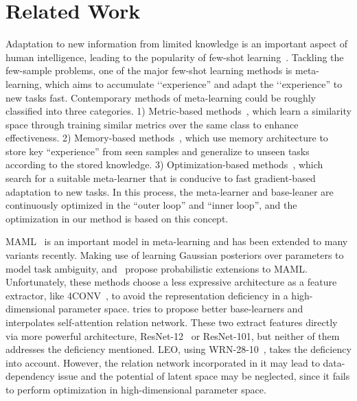 \documentclass[10pt,conference,a4paper]{IEEEtran}
\begin{document}
\section{Related Work}
Adaptation to new information from limited knowledge is an important aspect of human intelligence, leading to the popularity of few-shot learning~\cite{finn2017model, vinyals2016matching, snell2017prototypical, sung2018learning, DBLP:journals/corr/abs-1904-06317}. Tackling the few-sample problems, one of the major few-shot learning methods is meta-learning, which aims to accumulate ‘‘experience'' and adapt the ‘‘experience'' to new tasks fast. Contemporary methods of meta-learning could be roughly classified into three categories. 1) Metric-based methods~\cite{snell2017prototypical, vinyals2016matching, sung2018learning}, which learn a similarity space through training similar metrics over the same class to enhance effectiveness. 2) Memory-based methods~\cite{oreshkin2018tadam, mishra2018a}, which use memory architecture to store key “experience” from seen samples and generalize to unseen tasks according to the stored knowledge. 3) Optimization-based methods~\cite{finn2017model, lee2018gradient, grant2018recasting}, which search for a suitable meta-learner that is conducive to fast gradient-based adaptation to new tasks. In this process, the meta-learner and base-leaner are continuously optimized in the “outer loop” and “inner loop”, and the optimization in our method is based on this concept.

MAML~\cite{finn2017model} is an important model in meta-learning and has been extended to many variants recently. Making use of learning Gaussian posteriors over parameters to model task ambiguity, \cite{PLATIPUS2018} and~\cite{bayesianMAML2018} propose probabilistic extensions to MAML. Unfortunately, these methods choose a less expressive architecture as a feature extractor, like 4CONV~\cite{finn2017model}, to avoid the representation deficiency in a high-dimensional parameter space. \cite{lee2019meta} tries to propose better base-learners and~\cite{hui2019self} interpolates self-attention relation network. These two extract features directly via more powerful architecture, ResNet-12~\cite{oreshkin2018tadam} or ResNet-101, but neither of them addresses the deficiency mentioned. LEO\cite{rusu2019meta}, using WRN-28-10~\cite{ZagoruykoK16}, takes the deficiency into account. However, the relation network incorporated in it may lead to data-dependency issue and the potential of latent space may be neglected, since it fails to perform optimization in high-dimensional parameter space.
\end{document}
